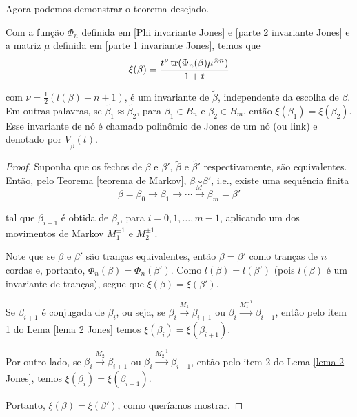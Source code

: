 	\par\vspace{0.3cm} Agora podemos demonstrar o teorema desejado.
	\begin{theorem}
		\label{polinomio de Jones}
		Com a função $\Phi_n$ definida em \eqref{Phi invariante Jones} e \eqref{parte 2 invariante Jones} e a matriz $\mu$ definida em \eqref{parte 1 invariante Jones}, temos que
		\begin{equation}
		\label{invariante Jones}
		\xi(\beta) = \frac{t^{\nu}\operatorname{tr}(\Phi_n(\beta)\mu^{\otimes n})}{1+t}
		\end{equation}
		\par\vspace{0.3cm} com $\nu = \displaystyle{ \frac{1}{2}(l(\beta) - n + 1) }$, é um invariante de $\widetilde{\beta}$, independente da escolha de $\beta$. Em outras palavras, se $\widetilde{\beta_1}\approx\widetilde{\beta_2}$, para $\beta_1\in B_n$ e $\beta_2\in B_m$, então $\xi(\beta_1) = \xi(\beta_2)$. Esse invariante de nó é chamado polinômio de Jones de um nó (ou link) e denotado por $V_{\widetilde{\beta}}(t)$.
	\end{theorem}
	\begin{proof}
		Suponha que os fechos de $\beta$ e $\beta'$, $\widetilde{\beta}$ e $\widetilde{\beta'}$ respectivamente, são equivalentes. Então, pelo Teorema \eqref{teorema de Markov}, $\beta\underset{M}{\sim}\beta'$, i.e., existe uma sequência finita
		\begin{equation*}
		\beta = \beta_0\to\beta_1\to\cdots\to\beta_m=\beta'
		\end{equation*}
		\par\vspace{0.3cm} tal que $\beta_{i+1}$ é obtida de $\beta_i$, para $i = 0,1,\dots,m-1$, aplicando um dos movimentos de Markov $M_1^{\pm1}$ e $M_2^{\pm1}$.
		\par\vspace{0.3cm} Note que se $\beta$ e $\beta'$ são tranças equivalentes, então $\beta = \beta'$ como tranças de $n$ cordas e, portanto, $\Phi_n(\beta) = \Phi_n(\beta')$. Como $l(\beta) = l(\beta')$ (pois $l(\beta)$ é um invariante de tranças), segue que $\xi(\beta) = \xi(\beta')$.
		\par\vspace{0.3cm} Se $\beta_{i+1}$ é conjugada de $\beta_i$, ou seja, se $\beta_i\xrightarrow{M_1}\beta_{i+1}$ ou $\beta_i\xrightarrow{M_1^{-1}}\beta_{i+1}$, então pelo item 1 do Lema \eqref{lema 2 Jones} temos $\xi(\beta_i) = \xi(\beta_{i+1})$.
		\par\vspace{0.3cm} Por outro lado, se $\beta_i\xrightarrow{M_2}\beta_{i+1}$ ou $\beta_i\xrightarrow{M_2^{-1}}\beta_{i+1}$, então pelo item 2 do Lema \eqref{lema 2 Jones}, temos $\xi(\beta_i) = \xi(\beta_{i+1})$.
		\par\vspace{0.3cm} Portanto, $\xi(\beta) = \xi(\beta')$, como queríamos mostrar.
	\end{proof}
